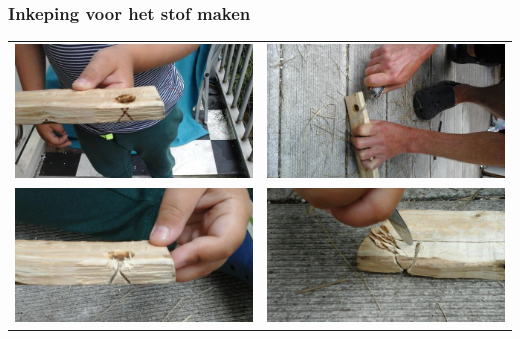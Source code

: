\documentclass[a4paper, handout]{beamer}
\begin{document}
\begin{frame}
	\frametitle{Inkeping voor het stof maken}
	\begin{tabular}{ c c }
		\includegraphics[scale=0.15]{inkeping-1}
		&
		\includegraphics[scale=0.15]{inkeping-2}
		\\
		\includegraphics[scale=0.15]{inkeping-3}
		&
		\includegraphics[scale=0.15]{inkeping-4}

\end{tabular}
\end{frame}
\end{document}
